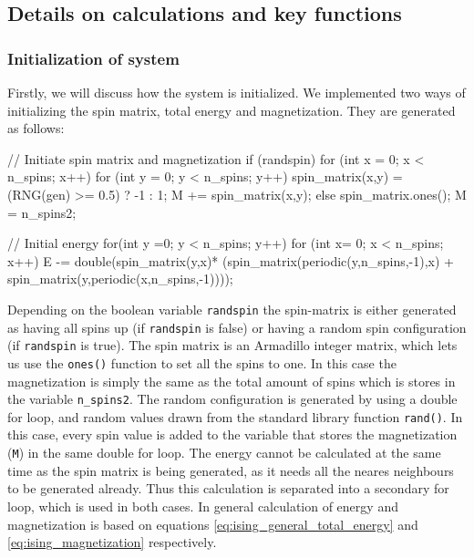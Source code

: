 \documentclass[reprint,english,notitlepage]{revtex4-1}  %
\begin{document}
\subsection{Details on calculations and key functions} \label{sec:III:a}

\subsubsection{Initialization of system} \label{sec:III:a:i}

Firstly, we will discuss how the system is initialized. We implemented two ways of initializing the spin matrix, total energy and magnetization. They are generated as follows:

\begin{cpp}
// Initiate spin matrix and magnetization
if (randspin) {
  for (int x = 0; x < n_spins; x++) {
    for (int y = 0; y < n_spins; y++) {
      spin_matrix(x,y) = (RNG(gen) >= 0.5) ? -1 : 1;
      M += spin_matrix(x,y);
    }
  }
} else {
  spin_matrix.ones();
  M = n_spins2;
}


// Initial energy
for(int y =0; y < n_spins; y++) {
  for (int x= 0; x < n_spins; x++){
    E -=  double(spin_matrix(y,x)*
          (spin_matrix(periodic(y,n_spins,-1),x) +
          spin_matrix(y,periodic(x,n_spins,-1))));
  }
}
\end{cpp}

Depending on the boolean variable \verb+randspin+ the spin-matrix is either generated as having all spins up (if \verb+randspin+ is false) or having a random spin configuration (if \verb+randspin+ is true). The spin matrix is an Armadillo \citep{Armadillo} integer matrix, which lets us use the \verb+ones()+ function to set all the spins to one. In this case the magnetization is simply the same as the total amount of spins which is stores in the variable \verb+n_spins2+. The random configuration is generated by using a double for loop, and random values drawn from the standard library function \verb+rand()+. In this case, every spin value is added to the variable that stores the magnetization (\verb+M+) in the same double for loop. The energy cannot be calculated at the same time as the spin matrix is being generated, as it needs all the neares neighbours to be generated already. Thus this calculation is separated into a secondary for loop, which is used in both cases. In general calculation of energy and magnetization is based on equations  \eqref{eq:ising_general_total_energy} and \eqref{eq:ising_magnetization} respectively.
\end{document}
